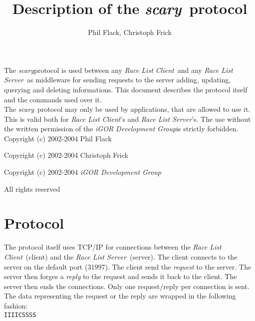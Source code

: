\documentclass[a4paper,10pt]{article}
\newcommand{\scary}{{\it scary}}
\newcommand{\rls}{{\it Race List Server}}
\newcommand{\rlc}{{\it Race List Client}}
\newcommand{\gplopdev}{{\it iGOR Development Group}}
\newcommand{\scaryport}{31997}
\begin{document}
\title{Description of the \scary\ protocol}
\author{Phil Flack, Christoph Frick}

\maketitle

\vspace{2in}

\abstract

The \scary protocol is used between any \rlc\ and any \rls\ as middleware for
sending requests to the server adding, updating, querying and deleting
informations. This document describes the protocol itself and the commands
used over it.\\

The \scary\ protocol may only be used by applications, that are allowed to use
it. This is valid both for \rlc's and \rls's. The use without the written
permission of the \gplopdev is strictly forbidden.\\

Copyright (c) 2002-2004 Phil Flack
          
Copyright (c) 2002-2004 Christoph Frick
          
Copyright (c) 2002-2004 \gplopdev

All rights reserved

\newpage


\section{Protocol}

The protocol itself uses TCP/IP for connections between the \rlc\ (client) and
the \rls\ (server). The client connects to the server on the default port
(\scaryport). The client send the {\it request} to the server. The server then
forges a {\it reply} to the request and sends it back to the client. The
server then ends the connections. Only one request/reply per connection is
sent.\\

The data representing the request or the reply are wrapped in the following
fashion:\\

{\tt IIIICSSSS}\\
\end{document}
